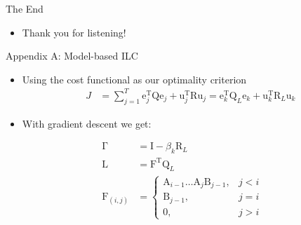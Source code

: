 \documentclass[handout]{beamer}
\newcommand{\boldvec}[1]{\boldsymbol{\mathrm{#1}}}
\let\vec\boldvec
\newcommand{\error}{\vec{e}} %
\newcommand{\sysInput}{\vec{u}} %
\newcommand{\qmatrix}{\vec{\Gamma}} %
\newcommand{\lmatrix}{\vec{L}} %
\newcommand{\ValueFunction}{J}
\begin{document}
%
\begin{frame}{The End}
\begin{itemize}
\item Thank you for listening!
\end{itemize}
\end{frame}
%
%
\begin{frame}{Appendix A: Model-based ILC}
\begin{itemize}
\item Using the cost functional as our optimality criterion
\begin{equation}
\begin{aligned}
\ValueFunction &= \sum_{j=1}^{T} \error_j^{\mathrm{T}}\vec{Q}\error_j + \sysInput_j^{\mathrm{T}}\vec{R}\sysInput_j = \error_k^{\mathrm{T}}\vec{Q}_L\error_k + \sysInput_k^{\mathrm{T}}\vec{R}_L\sysInput_k
\end{aligned}
\end{equation}
\item With gradient descent we get: 
\end{itemize}
\begin{equation*}
\begin{aligned}
\qmatrix &= \vec{I} - \beta_k \vec{R}_L \\
\lmatrix &= \vec{F}^{\mathrm{T}}\vec{Q}_L \\
\vec{F}_{(i,j)} &= \left \{
\begin{array}{cc}
\vec{A}_{i-1}\ldots \vec{A}_j\vec{B}_{j-1}, & j < i \\ 
\vec{B}_{j-1}, & j = i \\
\vec{0}, & j > i 
\end{array} \right.
\end{aligned}
\end{equation*}
\end{frame}
%
\end{document}

